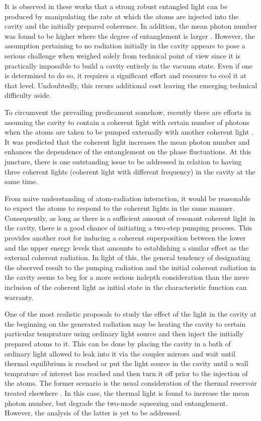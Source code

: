 \documentclass[twocolumn,showpacs,preprintnumbers,amsmath,amssymb,pra]{revtex4}
\begin{document}
It is observed in these works that a strong robust entangled light can be produced by manipulating the rate at which the atoms are injected into the cavity and the initially prepared coherence.  In addition, the mean photon number  was found to be higher where the degree of entanglement is larger \cite{jpb42215506}. However, the assumption pertaining to no radiation initially in the cavity appears to pose a serious challenge when weighed solely from technical point of view since it is practically impossible to build a cavity entirely in the vacuum state. Even if one is determined to do so, it requires a significant effort and resource to cool it at that level. Undoubtedly, this recurs additional cost leaving the emerging technical difficulty aside. 

To circumvent the prevailing predicament somehow, recently there are efforts in assuming the cavity to contain a coherent light with certain number of photons when the atoms  are taken to be pumped externally with another coherent light \cite{pra79013831,pra75062305}. It was predicted that the coherent light increases the mean photon number and enhances the dependence of the entanglement on the phase fluctuations. At this juncture, there is one outstanding issue to be addressed in relation to having three coherent lights (coherent light with different frequency) in the cavity at the same time. 

From naive understanding of atom-radiation interaction, it would be reasonable to expect the atoms to respond to the coherent lights in the same manner. Consequently, as long as there is a sufficient amount of resonant coherent light  in the cavity, there is a good chance of initiating a two-step pumping process. This provides  another root for inducing a coherent superposition between the lower and the upper energy levels that amounts to establishing a similar effect as the external coherent radiation. In light of this, the general tendency of designating the observed result to the pumping radiation and the initial coherent radiation in the cavity seems to beg for a more serious indepth consideration than the mere inclusion of the coherent light as initial state in the characteristic function can warranty. 

One of the most realistic proposals to study the effect of the light in the cavity at the beginning on the generated radiation may be heating the cavity to certain particular temprature using ordinary light source and then inject the initially prepared atoms to it. This can be done by placing the cavity in a bath of ordinary light allowed to leak into it via the coupler mirrors and wait until thermal equilibrium is reached or put the light source in the cavity until a wall temprature of interest has reached and then turn it off prior to the injection of the atoms. The former scenario is the usual consideration of the thermal reservoir treated elsewhere \cite{jpb402373}. In this case, the thermal light is found to increase the mean photon number, but degrade the two-mode squeezing and entanglement. However, the analysis of the  latter is yet to be addressed. 
\end{document}
